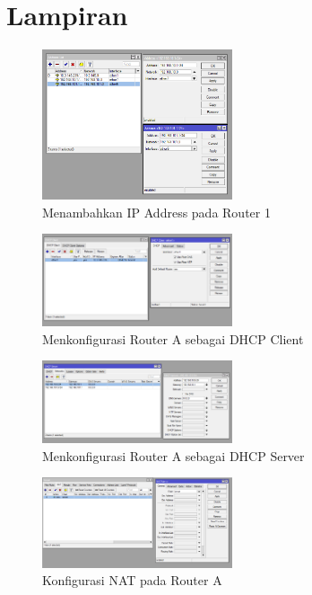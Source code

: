 \section{Lampiran}
\begin{figure}[h]
    \centering
    \includegraphics[width=0.5\textwidth]{dokum/Addreses R1.png}
    \caption{Menambahkan IP Address pada Router 1}
    \label{fig:addressr1}
\end{figure}
\begin{figure}[h]
    \centering
    \includegraphics[width=0.5\textwidth]{dokum/dhcp client r1.png}
    \caption{Menkonfigurasi Router A sebagai DHCP Client}
    \label{fig:DHCPclientr1}
\end{figure}
\begin{figure}[h]
    \centering
    \includegraphics[width=0.5\textwidth]{dokum/dhcp server r1.png}
    \caption{Menkonfigurasi Router A sebagai DHCP Server}
    \label{fig:DHCPserverr1}
\end{figure}
\begin{figure}[h]
    \centering
    \includegraphics[width=0.5\textwidth]{dokum/NAT r1.png}
    \caption{Konfigurasi NAT pada Router A}
    \label{fig:nat-ra}
\end{figure}

